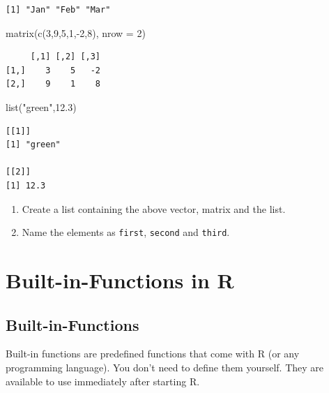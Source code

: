 \documentclass[
  letterpaper,
  DIV=11,
  numbers=noendperiod]{scrreprt}
\newenvironment{Shaded}{\begin{snugshade}}{\end{snugshade}}
\newcommand{\AttributeTok}[1]{\textcolor[rgb]{0.40,0.45,0.13}{#1}}
\newcommand{\DecValTok}[1]{\textcolor[rgb]{0.68,0.00,0.00}{#1}}
\newcommand{\FloatTok}[1]{\textcolor[rgb]{0.68,0.00,0.00}{#1}}
\newcommand{\FunctionTok}[1]{\textcolor[rgb]{0.28,0.35,0.67}{#1}}
\newcommand{\NormalTok}[1]{\textcolor[rgb]{0.00,0.23,0.31}{#1}}
\newcommand{\SpecialCharTok}[1]{\textcolor[rgb]{0.37,0.37,0.37}{#1}}
\newcommand{\StringTok}[1]{\textcolor[rgb]{0.13,0.47,0.30}{#1}}
\begin{document}
\begin{verbatim}
[1] "Jan" "Feb" "Mar"
\end{verbatim}

\begin{Shaded}
\begin{Highlighting}[]
\FunctionTok{matrix}\NormalTok{(}\FunctionTok{c}\NormalTok{(}\DecValTok{3}\NormalTok{,}\DecValTok{9}\NormalTok{,}\DecValTok{5}\NormalTok{,}\DecValTok{1}\NormalTok{,}\SpecialCharTok{{-}}\DecValTok{2}\NormalTok{,}\DecValTok{8}\NormalTok{), }\AttributeTok{nrow =} \DecValTok{2}\NormalTok{)}
\end{Highlighting}
\end{Shaded}

\begin{verbatim}
     [,1] [,2] [,3]
[1,]    3    5   -2
[2,]    9    1    8
\end{verbatim}

\begin{Shaded}
\begin{Highlighting}[]
\FunctionTok{list}\NormalTok{(}\StringTok{"green"}\NormalTok{,}\FloatTok{12.3}\NormalTok{)}
\end{Highlighting}
\end{Shaded}

\begin{verbatim}
[[1]]
[1] "green"

[[2]]
[1] 12.3
\end{verbatim}

\begin{enumerate}
\def\labelenumi{\arabic{enumi}.}
\item
  Create a list containing the above vector, matrix and the list.
\item
  Name the elements as \texttt{first}, \texttt{second} and
  \texttt{third}.
\end{enumerate}


\chapter{Built-in-Functions in R}\label{built-in-functions-in-r}

\section{Built-in-Functions}\label{built-in-functions}

Built-in functions are predefined functions that come with R (or any
programming language). You don't need to define them yourself. They are
available to use immediately after starting R.
\end{document}
